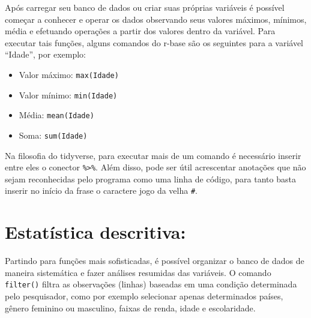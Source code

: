 \documentclass[
  brazil,
]{book}
\newenvironment{Shaded}{\begin{snugshade}}{\end{snugshade}}
\newcommand{\CommentTok}[1]{\textcolor[rgb]{0.56,0.35,0.01}{\textit{#1}}}
\newcommand{\DataTypeTok}[1]{\textcolor[rgb]{0.13,0.29,0.53}{#1}}
\newcommand{\KeywordTok}[1]{\textcolor[rgb]{0.13,0.29,0.53}{\textbf{#1}}}
\newcommand{\NormalTok}[1]{#1}
\newcommand{\OperatorTok}[1]{\textcolor[rgb]{0.81,0.36,0.00}{\textbf{#1}}}
\newcommand{\OtherTok}[1]{\textcolor[rgb]{0.56,0.35,0.01}{#1}}
\newcommand{\StringTok}[1]{\textcolor[rgb]{0.31,0.60,0.02}{#1}}
\providecommand{\tightlist}{%
  \setlength{\itemsep}{0pt}\setlength{\parskip}{0pt}}
\begin{document}
Após carregar seu banco de dados ou criar suas próprias variáveis é possível começar a conhecer e operar os dados observando seus valores máximos, mínimos, média e efetuando operações a partir dos valores dentro da variável. Para executar tais funções, alguns comandos do r-base são os seguintes para a variável ``Idade'', por exemplo:

\begin{itemize}
\tightlist
\item
  Valor máximo: \texttt{max(Idade)}
\item
  Valor mínimo: \texttt{min(Idade)}
\item
  Média: \texttt{mean(Idade)}
\item
  Soma: \texttt{sum(Idade)}
\end{itemize}

Na filosofia do tidyverse, para executar mais de um comando é necessário inserir entre eles o conector \texttt{\%\textgreater{}\%}. Além disso, pode ser útil acrescentar anotações que não sejam reconhecidas pelo programa como uma linha de código, para tanto basta inserir no início da frase o caractere jogo da velha \texttt{\#}.

\begin{Shaded}
\end{Shaded}

\hypertarget{estatuxedstica-descritiva}{%
\section{Estatística descritiva:}\label{estatuxedstica-descritiva}}

Partindo para funções mais sofisticadas, é possível organizar o banco de dados de maneira sistemática e fazer análises resumidas das variáveis. O comando \texttt{filter()} filtra as observações (linhas) baseadas em uma condição determinada pelo pesquisador, como por exemplo selecionar apenas determinados países, gênero feminino ou masculino, faixas de renda, idade e escolaridade.
\end{document}
